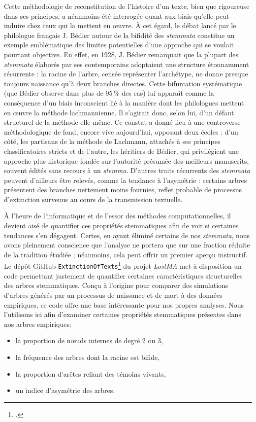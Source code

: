 \documentclass[a4paper,twoside,12pt]{book}
\begin{document}
Cette méthodologie de reconstitution de l’histoire d’un texte, bien que rigoureuse dans ses principes, a néanmoins été interrogée quant aux biais qu’elle peut induire chez ceux qui la mettent en œuvre. À cet égard, le débat lancé par le philologue français J. Bédier autour de la bifidité des \textit{stemmata} constitue un exemple emblématique des limites potentielles d’une approche qui se voulait pourtant objective.
 En effet, en 1928, J. Bédier  remarquait que la plupart des \textit{stemmata} élaborés par ses contemporains adoptaient une structure étonnamment récurrente : la racine de l’arbre, censée représenter l’archétype, ne donne presque toujours naissance qu’à deux branches directes. Cette bifurcation systématique (que Bédier observe dans plus de 95\,\% des cas) lui apparaît comme la conséquence d’un biais inconscient lié à la manière dont les philologues mettent en œuvre la méthode lachmannienne. Il s’agirait donc, selon lui, d’un défaut structurel de la méthode elle-même. Ce constat a donné lieu à une controverse méthodologique de fond, encore vive aujourd’hui, opposant deux écoles : d’un côté, les partisans de la méthode de Lachmann, attachés à ses principes classificatoires stricts et de l’autre, les héritiers de Bédier, qui privilégient une approche plus historique fondée sur l’autorité présumée des meilleurs manuscrits, souvent édités sans recours à un \textit{stemma}.  
 D’autres traits récurrents des \textit{stemmata} peuvent d’ailleurs être relevés, comme la tendance à l’asymétrie : certains arbres présentent des branches nettement moins fournies, reflet probable de processus d’extinction survenus au cours de la transmission textuelle.
 
À l’heure de l’informatique et de l’essor des méthodes computationnelles, il devient aisé de quantifier ces propriétés stemmatiques afin de voir si certaines tendances s'en dégagent. Certes, en ayant éliminé certains de nos \textit{stemmata}, nous avons pleinement conscience que l’analyse ne portera que sur une fraction réduite de la tradition étudiée ; néanmoins, cela peut offrir un premier aperçu instructif. Le dépôt GitHub \texttt{ExtinctionOfTexts}\footcite{extinction_texts_github} du projet \textit{LostMA} met à disposition un code permettant justement de quantifier certaines caractéristiques structurelles des arbres stemmatiques. Conçu à l’origine pour comparer des simulations d’arbres générés par un processus de naissance et de mort à des données empiriques, ce code offre une base intéressante pour nos propres analyses. Nous l’utilisons ici afin d’examiner certaines propriétés stemmatiques présentes dans nos arbres empiriques:
\begin{itemize}
	\item la proportion de nœuds internes de degré 2 ou 3,
	\item la fréquence des arbres dont la racine est bifide,
	\item la proportion d’arêtes reliant des témoins vivants,
	\item un indice d’asymétrie des arbres.\\
\end{itemize}
\end{document}
